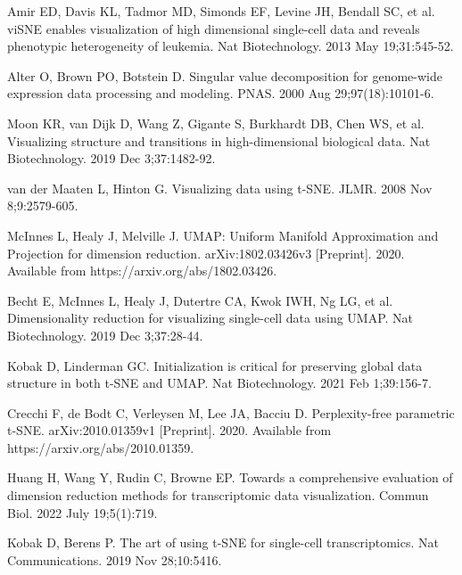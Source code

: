 \documentclass{article}
\begin{document}
\newpage



\begin{thebibliography}{10}

Amir ED, Davis KL, Tadmor MD, Simonds EF, Levine JH, Bendall SC, et al.
\newblock viSNE enables visualization of high dimensional single-cell data and reveals phenotypic heterogeneity of leukemia.
\newblock Nat Biotechnology. 2013 May 19;31:545-52.

Alter O, Brown PO, Botstein D.
\newblock Singular value decomposition for genome-wide expression data processing and modeling.
\newblock PNAS. 2000 Aug 29;97(18):10101-6.

Moon KR, van Dijk D, Wang Z, Gigante S, Burkhardt DB, Chen WS, et al.
\newblock Visualizing structure and transitions in high-dimensional biological data.
\newblock Nat Biotechnology. 2019 Dec 3;37:1482-92.

van der Maaten L, Hinton G.
\newblock Visualizing data using t-SNE.
\newblock JLMR. 2008 Nov 8;9:2579-605.

McInnes L, Healy J, Melville J.
\newblock UMAP: Uniform Manifold Approximation and Projection for dimension reduction.
\newblock arXiv:1802.03426v3 [Preprint]. 2020. Available from https://arxiv.org/abs/1802.03426.

Becht E, McInnes L, Healy J, Dutertre CA, Kwok IWH, Ng LG, et al.
\newblock Dimensionality reduction for visualizing single-cell data using UMAP.
\newblock Nat Biotechnology. 2019 Dec 3;37:28-44.

Kobak D, Linderman GC.
\newblock Initialization is critical for preserving global data structure in both t-SNE and UMAP.
\newblock Nat Biotechnology. 2021 Feb 1;39:156-7.

Crecchi F, de Bodt C, Verleysen M, Lee JA, Bacciu D.
\newblock Perplexity-free parametric t-SNE.
\newblock arXiv:2010.01359v1 [Preprint]. 2020. Available from https://arxiv.org/abs/2010.01359.

Huang H, Wang Y, Rudin C, Browne EP.
\newblock Towards a comprehensive evaluation of dimension reduction methods for transcriptomic data visualization.
\newblock Commun Biol. 2022 July 19;5(1):719.

Kobak D, Berens P.
\newblock The art of using t-SNE for single-cell transcriptomics.
\newblock Nat Communications. 2019 Nov 28;10:5416.


\end{thebibliography}
\end{document}
